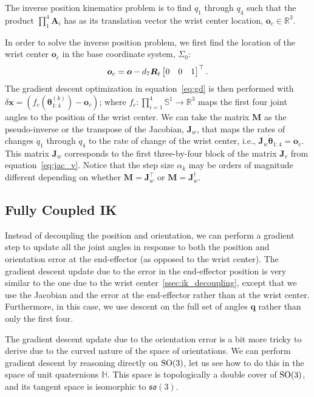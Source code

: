 The inverse position kinematics problem is to find $q_1$ through $q_4$ such
that the product $\prod_1^4 \bm{A}_i$ has as its translation vector the wrist
center location, $\bm{o}_c \in \mathbb{R}^3$.

In order to solve the inverse position problem, we first find the location of
the wrist center $\bm{o}_c$ in the base coordinate system,
$\Sigma_0$: \[ \bm{o}_c = \bm{o} - d_7 \bm{R}_t \begin{bmatrix}0 & 0 & 1\end{bmatrix}^\top. \]
%
The gradient descent optimization in equation~\eqref{eq:gd} is then performed 
with $\delta \bm{x} = \left(f_c\left(\bm{\theta}_{1:4}^{(k)}\right) - \bm{o}_c
\right)$; where $f_c: \prod_{i=1}^4 \mathbb{S}^1 \rightarrow \mathbb{R}^3$ maps
the first four joint angles to the position of the wrist center. We can take the
matrix $\bm{M}$ as the pseudo-inverse or the transpose of the Jacobian,
$\bm{J}_w$, that maps the rates of changes $\dot{q}_1$ through $\dot{q}_4$ to
the rate of change of the wrist center, i.e., $\bm{J}_w \dot{\bm{\theta}}_{1:4}
= \dot{\bm{o}}_c$. This matrix $\bm{J}_w$ corresponds to the first three-by-four
block of the matrix $\bm{J}_v$ from equation~\eqref{eq:jac_v}. 
%
Notice that the step size $\alpha_k$ may be orders of magnitude different
depending on whether $\bm{M} = \bm{J}_w^\top$ or $\bm{M} = \bm{J}_w^\dagger$. 


\subsection{Fully Coupled IK}
\label{ssec:ik_full}

Instead of decoupling the position and orientation, we can perform a gradient 
step to update all the joint angles in response to both the position and 
orientation error at the end-effector (as opposed to the wrist center). The 
gradient descent update due to the error in the end-effector position is very 
similar to the one due to the wrist center~\ref{ssec:ik_decoupling}, except that
we use the Jacobian and the error at the end-effector rather than at the wrist 
center. Furthermore, in this case, we use descent on the full set of angles
$\bm{q}$ rather than only the first four.

The gradient descent update due to the orientation error is a bit more tricky 
to derive due to the curved nature of the space of orientations. We can perform 
gradient descent by reasoning directly on $\mathrm{SO}(3)$, let us see how
to do this in the space of unit quaternions $\mathbb{H}$. This space is 
topologically a double cover of $\mathrm{SO}(3)$, and its tangent space is 
isomorphic to $\mathfrak{so}(3)$.

